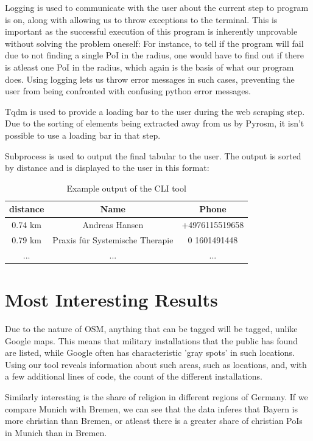 \documentclass[runningheads]{llncs}
\begin{document}
Logging is used to communicate with the user about the current step to program is on, along with allowing us to throw exceptions to the terminal. This is important as the successful execution of this program is inherently unprovable without solving the problem oneself: For instance, to tell if the program will fail due to not finding a single PoI in the radius, one would have to find out if there is atleast one PoI in the radius, which again is the basis of what our program does. Using logging lets us throw error messages in such cases, preventing the user from being confronted with confusing python error messages.

Tqdm is used to provide a loading bar to the user during the web scraping step. Due to the sorting of elements being extracted away from us by Pyrosm, it isn't possible to use a loading bar in that step.

Subprocess is used to output the final tabular to the user. The output is sorted by distance and is displayed to the user in this format:

\begin{table}[]
    \centering
    \begin{tabular}{c|c|c}
        distance & Name & Phone \\
        \hline
        0.74 km & Andreas Hansen & +4976115519658 \\
        0.79 km & Praxis für Systemische Therapie & 0 1601491448 \\
        ... & ... & ...
    \end{tabular}
    \bigskip
    \caption{Example output of the CLI tool}
    \label{tab:my_label}
\end{table}

\section{Most Interesting Results}
Due to the nature of OSM, anything that can be tagged will be tagged, unlike Google maps. This means that military installations that the public has found are listed, while Google often has characteristic 'gray spots' in such locations. Using our tool reveals information about such areas, such as locations, and, with a few additional lines of code, the count of the different installations.

Similarly interesting is the share of religion in different regions of Germany. If we compare Munich with Bremen, we can see that the data inferes that Bayern is more christian than Bremen, or atleast there is a greater share of christian PoIs in Munich than in Bremen.
\end{document}
